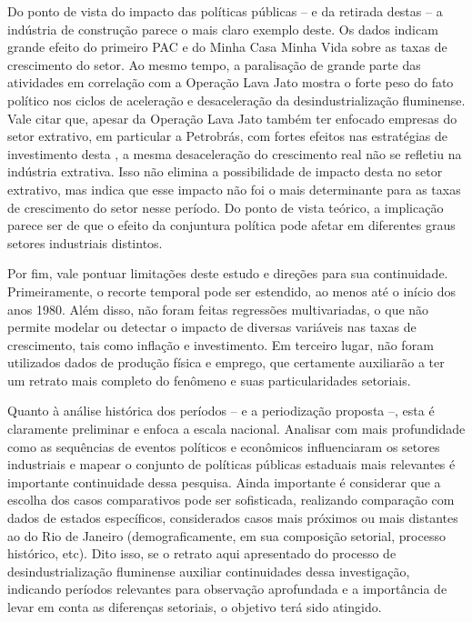 {{Do ponto de vista do impacto das políticas públicas -- e da retirada
destas -- a indústria de construção parece o mais claro exemplo deste.
Os dados indicam grande efeito do primeiro PAC e do Minha Casa Minha
Vida sobre as taxas de crescimento do setor. Ao mesmo tempo, a
paralisação de grande parte das atividades em correlação com a Operação
Lava Jato mostra o forte peso do fato político nos ciclos de aceleração
e desaceleração da desindustrialização fluminense. Vale citar que,
apesar da Operação Lava Jato também ter enfocado empresas do setor
extrativo, em particular a Petrobrás, com fortes efeitos nas estratégias
de investimento desta
\citep{dieese_implicacoes_2021}, a
mesma desaceleração do crescimento real não se refletiu na indústria
extrativa. Isso não elimina a possibilidade de impacto desta no setor
extrativo, mas indica que esse impacto não foi o mais determinante para
as taxas de crescimento do setor nesse período. Do ponto de vista
teórico, a implicação parece ser de que o efeito da conjuntura política
pode afetar em diferentes graus setores industriais distintos.

Por fim, vale pontuar limitações deste estudo e direções para sua
continuidade. Primeiramente, o recorte temporal pode ser estendido, ao
menos até o início dos anos 1980. Além disso, não foram feitas
regressões multivariadas, o que não permite modelar ou detectar o
impacto de diversas variáveis nas taxas de crescimento, tais como
inflação e investimento. Em terceiro lugar, não foram utilizados dados
de produção física e emprego, que certamente auxiliarão a ter um retrato
mais completo do fenômeno e suas particularidades setoriais.

Quanto à análise histórica dos períodos -- e a periodização proposta --,
esta é claramente preliminar e enfoca a escala nacional. Analisar com
mais profundidade como as sequências de eventos políticos e econômicos
influenciaram os setores industriais e mapear o conjunto de políticas
públicas estaduais mais relevantes é importante continuidade dessa
pesquisa. Ainda importante é considerar que a escolha dos casos
comparativos pode ser sofisticada, realizando comparação com dados de
estados específicos, considerados casos mais próximos ou mais distantes
ao do Rio de Janeiro (demograficamente, em sua composição setorial,
processo histórico, etc). Dito isso, se o retrato aqui apresentado do
processo de desindustrialização fluminense auxiliar continuidades dessa
investigação, indicando períodos relevantes para observação aprofundada
e a importância de levar em conta as diferenças setoriais, o objetivo
terá sido atingido.

}}
